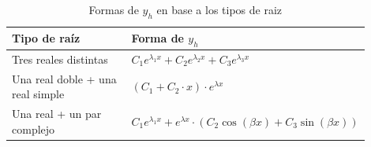 \begin{table}[H]
\centering
\caption{Formas de $y_{h}$ en base a los tipos de raiz}
\begin{threeparttable}
{
\begin{tabular}{p{0.45\linewidth}p{0.45\linewidth}}\hline

    \textbf{Tipo de raíz} & \textbf{Forma de $y_{h}$} \\ \hline

    Tres reales distintas & $C_{1}e^{\lambda_{1}x} + C_{2}e^{\lambda_{2}x} + C_{3}e^{\lambda_{3}x}$ \\
    Una real doble + una real simple & $(C_{1} + C_{2} \cdot x) \cdot e^{\lambda x}$ \\
    Una real + un par complejo & $C_{1}e^{\lambda_{1}x} + e^{\lambda x} \cdot (C_{2}\cos{(\beta x)} + C_{3}\sin{(\beta x)})$ \\
    
    \hline
\end{tabular}
}
\begin{tablenotes} %
\item[] 
\end{tablenotes}
\end{threeparttable}
\label{tab:eq_tercer_orden}
\end{table}